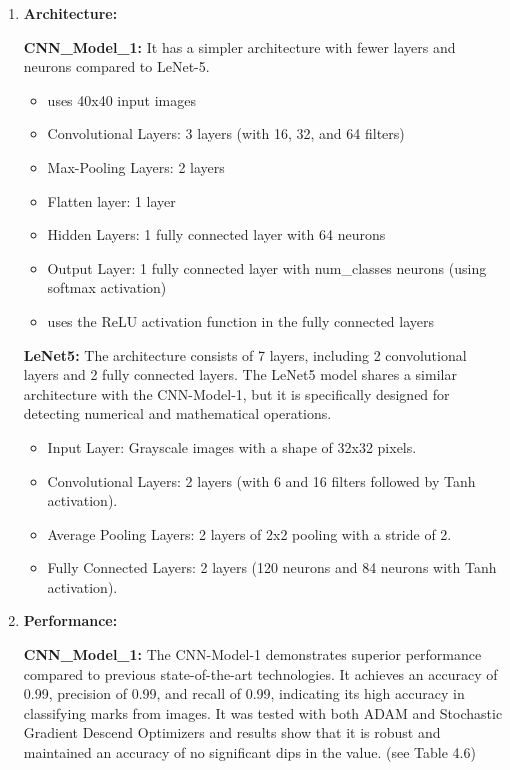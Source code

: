\begin{enumerate}

\item \textbf{Architecture:}

\textbf{CNN\_Model\_1:} 
 It has a simpler architecture with fewer layers and neurons compared to LeNet-5.
\begin{itemize} 
    \item uses 40x40 input images
    \item Convolutional Layers: 3 layers (with 16, 32, and 64 filters)
    \item Max-Pooling Layers: 2 layers
    \item Flatten layer: 1 layer
    \item Hidden Layers: 1 fully connected layer with 64 neurons
    \item Output Layer: 1 fully connected layer with num\_classes neurons (using softmax activation)
    \item uses the ReLU activation function in the fully connected layers

\end{itemize}

\textbf{LeNet5:}  The architecture consists of 7 layers, including 2 convolutional layers and 2 fully connected layers. The LeNet5 model shares a similar architecture with the CNN-Model-1, but it is specifically designed for detecting numerical and mathematical operations.
\begin{itemize}
\item Input Layer: Grayscale images with a shape of 32x32 pixels.

\item Convolutional Layers: 2 layers (with 6 and 16 filters  followed by Tanh activation).

\item Average Pooling Layers: 2 layers of 2x2 pooling with a stride of 2.

\item Fully Connected Layers: 2 layers (120 neurons and 84 neurons with Tanh activation).

\end{itemize}


\item \textbf{Performance:}

\textbf{CNN\_Model\_1:} The CNN-Model-1 demonstrates superior performance compared to previous state-of-the-art technologies. It achieves an accuracy of 0.99, precision of 0.99, and recall of 0.99, indicating its high accuracy in classifying marks from images. It was tested with both ADAM and Stochastic Gradient Descend Optimizers and results show that it is robust and maintained an accuracy of no significant dips in the value. (see Table 4.6)\\


\end{enumerate}
